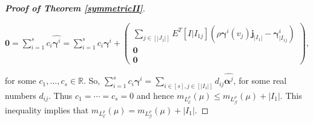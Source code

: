 \documentclass{amsart}
\theoremstyle{remark}
\begin{document}
\begin{proof}[\textbf{Proof of Theorem \ref{symmetricII}}]
\begin{center}
\footnotesize
$\pmb{0}=\sum_{i=1}^{s}c_{i}\widehat{\pmb{\gamma}^{i}}=
\sum_{i=1}^{s}c_{i}\pmb{\gamma}^{i}+
\begin{pmatrix}
\sum_{j\in [|J_{1}|]} E^{T}[I|I_{1j}](\rho\pmb{\gamma}^{i}(v_{j})\pmb{j}_{|I_{1}|}-\pmb{\gamma}^{i}_{|I_{1j}}) \\
 \pmb{0}\\
 \pmb{0}
\end{pmatrix},$
\end{center}
for some $c_{1},\ldots,c_{s}\in\mathbb{R}$. So, $\sum_{i=1}^{s}c_{i}\pmb{\gamma}^{i}=\sum_{i\in [s],j\in [|I_{1}|]}d_{ij}\widehat{\pmb{\alpha}^{j}}$, for some real numbers $d_{ij}$.
Thus $c_{1}=\cdots=c_{s}=0$ and hence $m_{L_{\mathcal{E}}^{\rho}}(\mu)\leq m_{L_{\mathcal{G}}^{\rho}}(\mu)+|I_{1}|$.
This inequality implies that $m_{L_{\mathcal{E}}^{\rho}}(\mu)=m_{L_{\mathcal{G}}^{\rho}}(\mu)+|I_{1}|$.
\end{proof}
\end{document}
